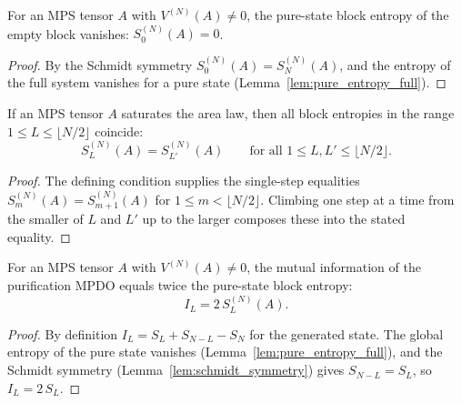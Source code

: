 \begin{lemma}
    \label{lem:pure_block_entropy_empty}
    \leanok
    For an MPS tensor $A$ with $V^{(N)}(A)\neq 0$, the pure-state block entropy of the
    empty block vanishes: $S_0^{(N)}(A) = 0$.
\end{lemma}
\begin{proof}\leanok
    By the Schmidt symmetry $S_0^{(N)}(A) = S_{N}^{(N)}(A)$, and the entropy of the full
    system vanishes for a pure state (Lemma~\ref{lem:pure_entropy_full}).
\end{proof}

\begin{lemma}
    \label{lem:pure_sal_const}
    \leanok
    If an MPS tensor $A$ saturates the area law, then all block entropies in the
    range $1\le L\le\lfloor N/2\rfloor$ coincide:
    \[
        S_L^{(N)}(A) = S_{L'}^{(N)}(A)
        \qquad
        \text{for all } 1\le L, L'\le \lfloor N/2\rfloor .
    \]
\end{lemma}
\begin{proof}\leanok
    The defining condition supplies the single-step equalities
    $S_m^{(N)}(A) = S_{m+1}^{(N)}(A)$ for $1\le m<\lfloor N/2\rfloor$. Climbing one
    step at a time from the smaller of $L$ and $L'$ up to the larger composes these
    into the stated equality.
\end{proof}

\begin{lemma}
    \label{lem:mutual_info_doubled}
    \leanok
    For an MPS tensor $A$ with $V^{(N)}(A)\neq 0$, the mutual information of the
    purification MPDO equals twice the pure-state block entropy:
    \[
        I_L = 2\,S_L^{(N)}(A).
    \]
\end{lemma}
\begin{proof}\leanok
    By definition $I_L = S_L + S_{N-L} - S_N$ for the generated state. The global
    entropy of the pure state vanishes (Lemma~\ref{lem:pure_entropy_full}), and
    the Schmidt symmetry (Lemma~\ref{lem:schmidt_symmetry}) gives
    $S_{N-L} = S_L$, so $I_L = 2\,S_L$.
\end{proof}

